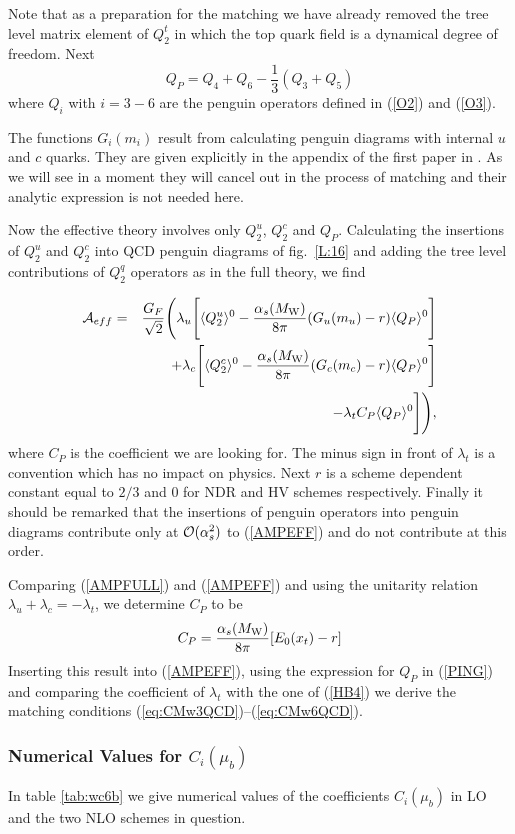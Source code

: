 \documentclass[12pt]{article}
\def\as{\alpha_s}
\newcommand{\mw}{M_{\rm W}}
\newcommand{\be}{\begin{equation}}
\newcommand{\ee}{\end{equation}}
\newcommand{\ord}{{\cal O}}
\begin{document}
\begin{itemize}
\begin{itemize}
Note that as a preparation for the matching we have already
removed the tree level matrix element of $Q_2^t$ in which
the top quark field is a dynamical degree of freedom.
Next
\be\label{PING}
Q_P=Q_4+Q_6-\frac{1}{3} (Q_3+Q_5)
\ee
where $Q_i$ with $i=3-6$ are the penguin operators defined
in (\ref{O2}) and (\ref{O3}).

The functions $G_i(m_i)$ result from calculating penguin diagrams
with internal $u$ and $c$ quarks. They are given explicitly in
the appendix of the first paper in \cite{BJLW1}. 
As we will see in a moment they will
cancel out in the process of matching and their analytic expression
is not needed here.

Now the effective theory involves only $Q_2^u$, $Q_2^c$ and $Q_P$.
Calculating the insertions of $Q_2^u$ and $Q_2^c$ into QCD penguin
diagrams of fig.~\ref{L:16} and adding the tree level contributions 
of $Q_2^q$ operators
as in the full theory, we find
 
\begin{eqnarray}\label{AMPEFF} 
{\cal A}_{eff} &=& 
\frac{G_F}{\sqrt{2}} 
\Bigg(\lambda_u \Bigg[\langle Q^u_2 \rangle^0  
 -\frac{\as(\mw)}{8\pi} (G_u(m_u)-r) \langle Q_P\rangle
^0\Bigg]
\nonumber\\ 
&& ~~~~~+\lambda_c \Bigg[\langle Q^c_2 \rangle^0  
 -\frac{\as(\mw)}{8\pi} (G_c(m_c)-r) \langle Q_P\rangle ^0\Bigg] 
\nonumber \\
&& ~~~~-\lambda_t C_P \langle Q_P\rangle ^0 \Bigg]\Bigg),
\end{eqnarray} 
where $C_P$ is the coefficient we are looking for. The minus sign
in front of $\lambda_t$ is a convention which has no impact on
physics. Next $r$ is a scheme dependent constant
equal to $2/3$ and $0$ for NDR and HV schemes respectively.
Finally it should be remarked that the insertions of penguin
operators into penguin diagrams contribute only at $\ord(\as^2)$
to (\ref{AMPEFF}) and do not contribute at this order.

Comparing (\ref{AMPFULL}) and (\ref{AMPEFF}) and using the unitarity
relation $\lambda_u+\lambda_c=-\lambda_t$, we determine $C_P$ to
be
\be\label{COFFCP}
C_P=\frac{\as(\mw)}{8\pi}[E_0(x_t)-r]
\ee
Inserting this result into (\ref{AMPEFF}), using the expression
for $Q_P$ in (\ref{PING}) and comparing the coefficient of $\lambda_t$
with the one of (\ref{HB4}) we derive the matching conditions 
(\ref{eq:CMw3QCD})--(\ref{eq:CMw6QCD}).  
\subsubsection{Numerical Values for $C_i(\mu_b)$}
In table \ref{tab:wc6b} we give numerical values of the coefficients
$C_i(\mu_b)$ in LO and the two NLO schemes in question.


\end{itemize}
\end{itemize}
\end{document}
